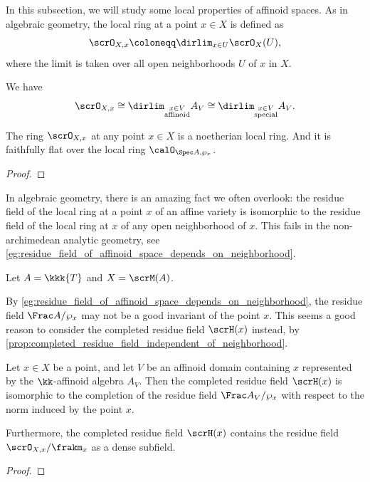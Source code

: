     In this subsection, we will study some local properties of affinoid spaces.
    As in algebraic geometry, the local ring at a point \(x \in X\) is defined as
    \[ \scrO_{X,x} \coloneqq \dirlim_{x \in U} \scrO_X(U), \]
    where the limit is taken over all open neighborhoods \(U\) of \(x\) in \(X\).

    \begin{proposition}\label{prop:local_ring_of_affinoid_space_can_be_computed_by_affinoid_or_special_domain}
        We have 
        \[ \scrO_{X,x} \cong \dirlim_{\substack{x \in V \\ \text{affinoid}}} A_V \cong \dirlim_{\substack{x \in V \\ \text{special}}} A_V. \]
    \end{proposition}
    \Yang{}

    \begin{theorem}\label{prop:local_ring_of_affinoid_space_is_noetherian}
        The ring \(\scrO_{X,x}\) at any point \(x \in X\) is a noetherian local ring.
        And it is faithfully flat over the local ring \(\calO_{\Spec A, \wp_x}\).
    \end{theorem}
    \begin{proof}
    \end{proof}

    In algebraic geometry, there is an amazing fact we often overlook: the residue field of the local ring at a point \(x\) of an affine variety is isomorphic to the residue field of the local ring at \(x\) of any open neighborhood of \(x\).
    This fails in the non-archimedean analytic geometry, see \cref{eg:residue_field_of_affinoid_space_depends_on_neighborhood}. 

    \begin{example}\label{eg:residue_field_of_affinoid_space_depends_on_neighborhood}
        Let \(A = \kkk\{T\}\) and \(X= \scrM(A)\).

    \end{example}

    By \cref{eg:residue_field_of_affinoid_space_depends_on_neighborhood}, the residue field \(\Frac A/\wp_x\) may not be a good invariant of the point \(x\).
    This seems a good reason to consider the completed residue field \(\scrH(x)\) instead, by \cref{prop:completed_residue_field_independent_of_neighborhood}.

    \begin{proposition}\label{prop:completed_residue_field_independent_of_neighborhood}
        Let \(x \in X\) be a point, and let \(V\) be an affinoid domain containing \(x\) represented by the \(\kk\)-affinoid algebra \(A_V\).
        Then the completed residue field \(\scrH(x)\) is isomorphic to the completion of the residue field \(\Frac A_V/\wp_x\) with respect to the norm induced by the point \(x\).

        Furthermore, the completed residue field \(\scrH(x)\) contains the residue field \(\scrO_{X,x}/\frakm_x\) as a dense subfield.
    \end{proposition}
    \begin{proof}
    \end{proof}

